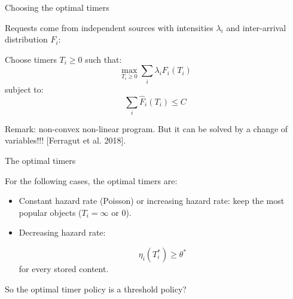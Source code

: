 \documentclass[aspectratio=169]{beamer}
\begin{document}
\begin{frame}{Choosing the optimal timers}

	Requests come from independent sources with intensities $\lambda_i$ and inter-arrival distribution $F_i$:

	\vfill

	\begin{problem}
		Choose timers $T_i\geqslant 0$ such that:
		\begin{equation*}
			\max_{T_i\geqslant 0} \sum_i \lambda_i F_i(T_i)
		\end{equation*}
		subject to:
		\begin{equation*}
			\sum_i \hat{F}_i(T_i) \leqslant C
		\end{equation*}
	\end{problem}

	\vfill
	\alert{Remark:} non-convex non-linear program. But it can be solved by a change of variables!!! [Ferragut et al. 2018].
\end{frame}

\begin{frame}{The optimal timers}

	\begin{theorem}
		For the following cases, the optimal timers are:

		\begin{itemize}
			\item Constant hazard rate (Poisson) or increasing hazard rate: keep the most popular objects ($T_i=\infty$ or $0$).
			
			\item Decreasing hazard rate:
			
			\begin{equation*}
				\eta_i (T_i^*) \geqslant \theta^*
			   \end{equation*}
			  for every stored content.
		\end{itemize}
	\end{theorem}
	\pause
	\vfill
	So the optimal timer policy is a threshold policy?
\end{frame}
\end{document}
